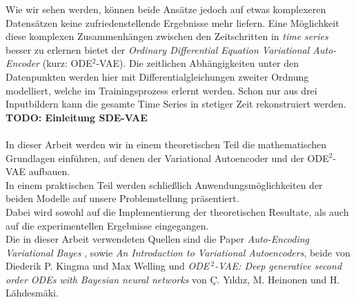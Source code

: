 \documentclass[12pt]{article}
\begin{document}
	Wie wir sehen werden, können beide Ansätze jedoch auf etwas komplexeren Datensätzen keine zufriedenstellende Ergebnisse mehr liefern.
	Eine Möglichkeit diese komplexen Zusammenhängen zwischen den Zeitschritten in \emph{time series} besser zu erlernen bietet der \emph{Ordinary Differential Equation Variational Auto-Encoder} (kurz: ODE$^2$-VAE). Die zeitlichen Abhängigkeiten unter den Datenpunkten werden hier mit Differentialgleichungen zweiter Ordnung modelliert, welche im Trainingsprozess erlernt werden. Schon nur aus drei Inputbildern kann die gesamte Time Series in stetiger Zeit rekonstruiert werden.\\
	\textbf{TODO: Einleitung SDE-VAE}
	\\
	\\
	In dieser Arbeit werden wir in einem theoretischen Teil die mathematischen Grundlagen einführen, auf denen der Variational Autoencoder und der ODE$^2$-VAE aufbauen.\\ 
	In einem praktischen Teil werden schließlich Anwendungsmöglichkeiten der beiden Modelle auf unsere Problemstellung präsentiert.\\
	Dabei wird sowohl auf die Implementierung der
	theoretischen Resultate, als auch auf die experimentellen Ergebnisse eingegangen.\\
	Die in dieser Arbeit verwendeten Quellen sind die Paper \emph{Auto-Encoding Variational Bayes} \cite{vae}, sowie \emph{An Introduction to Variational Autoencoders}, \cite{intvae} beide von Diederik P. Kingma und Max Welling und \emph{ODE$^{\ 2}$-VAE: Deep generative second order ODEs with Bayesian neural networks} \cite{ode2vae} von Ç. Yıldız, M. Heinonen und H. Lähdesmäki.
	\newpage
	
\end{document}
